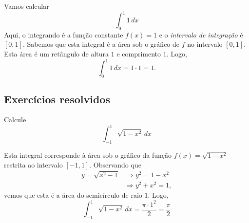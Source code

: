 \cleardoublepage\documentclass[../main.tex]{subfiles}
\begin{document}

\begin{ex}
  Vamos calcular
  \begin{equation*}
    \int_0^1 1\,dx
  \end{equation*}
  Aqui, o integrando é a função constante $f(x) = 1$ e o \emph{intervalo de integração} é $[0, 1]$. Sabemos que esta integral é a área sob o gráfico de $f$ no intervalo $[0, 1]$. Esta área é um retângulo de altura $1$ e comprimento $1$. Logo,
  \begin{equation*}
    \int_0^1 1\,dx = 1\cdot 1 = 1.
  \end{equation*}
\end{ex}

\subsection{Exercícios resolvidos}

\begin{exeresol}
  Calcule
  \begin{equation*}
    \int_{-1}^1 \sqrt{1 - x^2}\,dx
  \end{equation*}
\end{exeresol}
\begin{resol}
  Esta integral corresponde à área sob o gráfico da função $f(x) = \sqrt{1 - x^2}$ restrita ao intervalo $[-1, 1]$. Observando que
  \begin{align*}
    y = \sqrt{x^2 - 1} &\Rightarrow y^2 = 1 - x^2\\
                       &\Rightarrow y^2 + x^2 = 1,
  \end{align*}
  vemos que esta é a área do semicírculo de raio $1$. Logo,
  \begin{equation*}
    \int_{-1}^1 \sqrt{1 - x^2}\,dx = \frac{\pi \cdot 1^2}{2} = \frac{\pi}{2}
  \end{equation*}
\end{resol}
\end{document}

